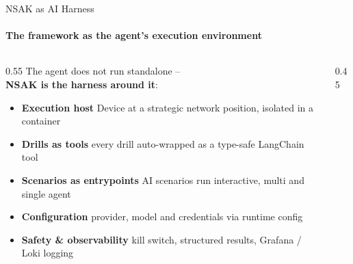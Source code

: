 \begin{frame}{NSAK as AI Harness}
    \framesubtitle{The framework as the agent's execution environment}

    \begin{columns}[T,onlytextwidth]
        \begin{column}{0.55\textwidth}
            The agent does not run standalone --\\ \textbf{NSAK is the harness around it}:
            \vspace{0.4em}
            \begin{itemize}[<+->]
                \item<1->[\faServer] \textbf{Execution host} \scriptsize Device at a strategic network position, isolated in a container
                \item<2->[\faCogs] \textbf{Drills as tools} \scriptsize every drill auto-wrapped as a type-safe LangChain tool
                \item<3->[\faLayerGroup] \textbf{Scenarios as entrypoints} \scriptsize AI scenarios run interactive, multi and single agent
                \item<4->[\faSlidersH] \textbf{Configuration} \scriptsize provider, model and credentials via runtime config
                \item<5->[\faPowerOff] \textbf{Safety \& observability} \scriptsize kill switch, structured results, Grafana / Loki logging
            \end{itemize}
        \end{column}

        \begin{column}{0.45\textwidth}
        \end{column}
    \end{columns}
\end{frame}
